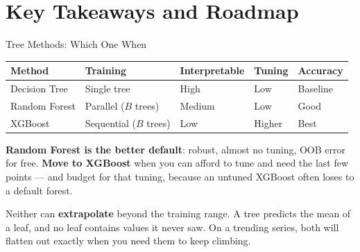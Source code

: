 \documentclass[aspectratio=169, 11pt]{beamer}
\begin{document}
\section{Key Takeaways and Roadmap}


\begin{frame}{Tree Methods: Which One When}
  \begin{center}
    {\small
    \begin{tabular}{lllll}
      \toprule
      \textbf{Method} & \textbf{Training} & \textbf{Interpretable} & \textbf{Tuning} & \textbf{Accuracy} \\
      \midrule
      Decision Tree & Single tree & High & Low & Baseline \\
      Random Forest & Parallel ($B$ trees) & Medium & Low & Good \\
      XGBoost & Sequential ($B$ trees) & Low & Higher & Best \\
      \bottomrule
    \end{tabular}
    }
  \end{center}

  \textbf{Random Forest is the better default}: robust, almost no tuning, OOB error for free.
  \textbf{Move to XGBoost} when you can afford to tune and need the last few points --- and
  budget for that tuning, because an untuned XGBoost often loses to a default forest.
  \begin{warningbox}
    Neither can \textbf{extrapolate} beyond the training range. A tree predicts the mean of a
    leaf, and no leaf contains values it never saw. On a trending series, both will flatten
    out exactly when you need them to keep climbing.
  \end{warningbox}
\end{frame}
\end{document}
